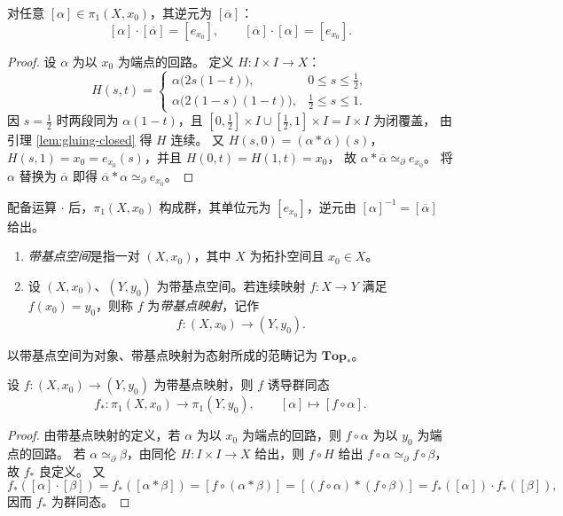 \documentclass[lang=cn,a4paper,newtx,figureplace=section,tableplace=section]{elegantbook}
\begin{document}
\begin{proposition}\label{prop:pi1-inverse}
  对任意 $[\alpha]\in\pi_1(X,x_0)$，其逆元为 $[\overline\alpha]$：
  \[
    [\alpha]\cdot[\overline\alpha]=[e_{x_0}],\qquad [\overline\alpha]\cdot[\alpha]=[e_{x_0}].
  \]
\end{proposition}
\begin{proof}
  设 $\alpha$ 为以 $x_0$ 为端点的回路。
  定义 $H:I\times I\to X$：
  \[
    H(s,t)=\begin{cases}
      \alpha\big(2s(1-t)\big), & 0\le s\le\tfrac12,\\
      \alpha\big(2(1-s)(1-t)\big), & \tfrac12\le s\le 1.
    \end{cases}
  \]
  因 $s=\tfrac12$ 时两段同为 $\alpha(1-t)$，且 $[0,\tfrac12]\times I\cup [\tfrac12,1]\times I=I\times I$ 为闭覆盖，
  由引理 \ref{lem:gluing-closed} 得 $H$ 连续。
  又 $H(s,0)=(\alpha\ast\overline\alpha)(s)$，$H(s,1)=x_0=e_{x_0}(s)$，并且 $H(0,t)=H(1,t)=x_0$，
  故 $\alpha\ast\overline\alpha\simeq_{\partial} e_{x_0}$。
  将 $\alpha$ 替换为 $\overline\alpha$ 即得 $\overline\alpha\ast\alpha\simeq_{\partial} e_{x_0}$。
\end{proof}

\begin{theorem}\label{thm:fundamental-group-is-group}
  配备运算 $\cdot$ 后，$\pi_1(X,x_0)$ 构成群，其单位元为 $[e_{x_0}]$，逆元由 $[\alpha]^{-1}=[\overline\alpha]$ 给出。
\end{theorem}

\begin{definition}[带基点空间与带基点映射]
  \begin{enumerate}[(1)]
    \item \emph{带基点空间}是指一对 $(X,x_0)$，其中 $X$ 为拓扑空间且 $x_0\in X$。
    \item 设 $(X,x_0)$、$(Y,y_0)$ 为带基点空间。若连续映射 $f:X\to Y$ 满足 $f(x_0)=y_0$，则称 $f$ 为\emph{带基点映射}，记作
    \[
      f:(X,x_0)\to(Y,y_0).
    \]
  \end{enumerate}
\end{definition}

\begin{definition}
  以带基点空间为对象、带基点映射为态射所成的范畴记为 $\mathbf{Top}_*$。
\end{definition}

\begin{proposition}\label{prop:pi1-induced-hom}
  设 $f:(X,x_0)\to (Y,y_0)$ 为带基点映射，则 $f$ 诱导群同态
  \[
    f_*:\pi_1(X,x_0)\to\pi_1(Y,y_0),\qquad [\alpha]\mapsto [f\circ\alpha].
  \]
\end{proposition}
\begin{proof}
  由带基点映射的定义，若 $\alpha$ 为以 $x_0$ 为端点的回路，则 $f\circ\alpha$ 为以 $y_0$ 为端点的回路。
  若 $\alpha\simeq_{\partial}\beta$，由同伦 $H:I\times I\to X$ 给出，则 $f\circ H$ 给出 $f\circ\alpha\simeq_{\partial} f\circ\beta$，故 $f_*$ 良定义。
  又
  \[
    f_*([\alpha]\cdot[\beta])=f_*([\alpha\ast\beta])=[f\circ(\alpha\ast\beta)]=[(f\circ\alpha)\ast(f\circ\beta)]=f_*([\alpha])\cdot f_*([\beta]),
  \]
  因而 $f_*$ 为群同态。
\end{proof}
\end{document}
